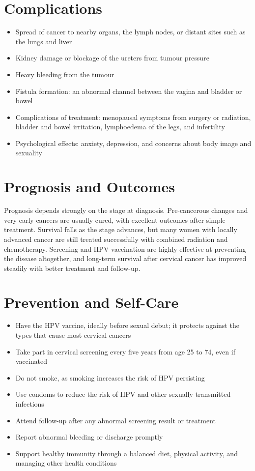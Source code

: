 \section*{Complications}
\begin{itemize}
    \item Spread of cancer to nearby organs, the lymph nodes, or distant sites such as the lungs and liver
    \item Kidney damage or blockage of the ureters from tumour pressure
    \item Heavy bleeding from the tumour
    \item Fistula formation: an abnormal channel between the vagina and bladder or bowel
    \item Complications of treatment: menopausal symptoms from surgery or radiation, bladder and bowel irritation, lymphoedema of the legs, and infertility
    \item Psychological effects: anxiety, depression, and concerns about body image and sexuality
\end{itemize}

\section*{Prognosis and Outcomes}
Prognosis depends strongly on the stage at diagnosis. Pre-cancerous changes and very early cancers are usually cured, with excellent outcomes after simple treatment. Survival falls as the stage advances, but many women with locally advanced cancer are still treated successfully with combined radiation and chemotherapy. Screening and HPV vaccination are highly effective at preventing the disease altogether, and long-term survival after cervical cancer has improved steadily with better treatment and follow-up.

\section*{Prevention and Self-Care}
\begin{itemize}
    \item Have the HPV vaccine, ideally before sexual debut; it protects against the types that cause most cervical cancers
    \item Take part in cervical screening every five years from age 25 to 74, even if vaccinated
    \item Do not smoke, as smoking increases the risk of HPV persisting
    \item Use condoms to reduce the risk of HPV and other sexually transmitted infections
    \item Attend follow-up after any abnormal screening result or treatment
    \item Report abnormal bleeding or discharge promptly
    \item Support healthy immunity through a balanced diet, physical activity, and managing other health conditions
\end{itemize}

